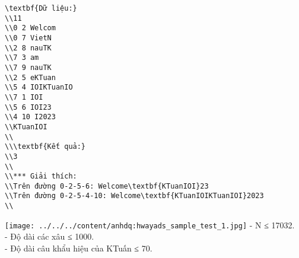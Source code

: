 \begin{verbatim}
\textbf{Dữ liệu:}
\\11
\\0 2 Welcom
\\0 7 VietN
\\2 8 nauTK
\\7 3 am
\\7 9 nauTK
\\2 5 eKTuan
\\5 4 IOIKTuanIO
\\7 1 IOI
\\5 6 IOI23
\\4 10 I2023
\\KTuanIOI
\\
\\\textbf{Kết quả:}
\\3
\\
\\*** Giải thích:
\\Trên đường 0-2-5-6: Welcome\textbf{KTuanIOI}23
\\Trên đường 0-2-5-4-10: Welcome\textbf{KTuanIOIKTuanIOI}2023
\\\end{verbatim}


\texttt{[image: ../../../content/anhdq:hwayads\_sample\_test\_1.jpg]}
- N ≤ 17032.   
\\   - Độ dài các xâu ≤ 1000.   
\\   - Độ dài câu khẩu hiệu của KTuấn ≤ 70.